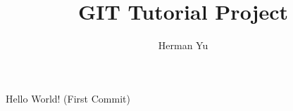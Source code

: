 \documentclass[12pt]{article}
\begin{document}
\title{GIT Tutorial Project}
\date{}
\author{Herman Yu}
\maketitle

Hello World! (First Commit)
\end{document}
